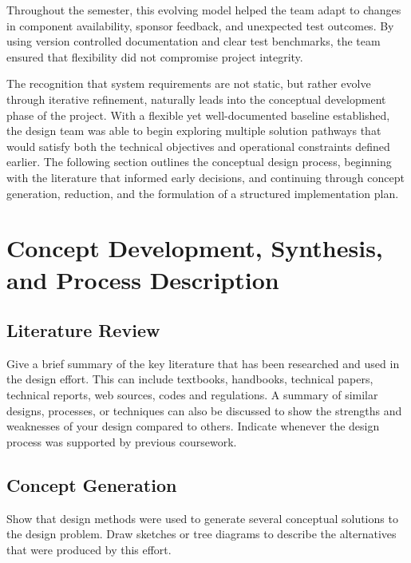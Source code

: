 \documentclass[12pt]{article}
\begin{document}
\par Throughout the semester, this evolving model helped the team adapt to changes in component availability, sponsor feedback, and unexpected test outcomes. By using version controlled documentation and clear test benchmarks, the team ensured that flexibility did not compromise project integrity.

\par The recognition that system requirements are not static, but rather evolve through iterative refinement, naturally leads into the conceptual development phase of the project. With a flexible yet well-documented baseline established, the design team was able to begin exploring multiple solution pathways that would satisfy both the technical objectives and operational constraints defined earlier. The following section outlines the conceptual design process, beginning with the literature that informed early decisions, and continuing through concept generation, reduction, and the formulation of a structured implementation plan.


\section{Concept Development, Synthesis, and Process Description}
\subsection{Literature Review}
Give a brief summary of the key literature that has been researched and used in the design effort. This can include textbooks, handbooks, technical papers, technical reports, web sources, codes and regulations. A summary of similar designs, processes, or techniques can also be discussed to show the strengths and weaknesses of your design compared to others. Indicate whenever the design process was supported by previous coursework.

\subsection{Concept Generation}
Show that design methods were used to generate several conceptual solutions to the design problem. Draw sketches or tree diagrams to describe the alternatives that were produced by this effort.
\end{document}

